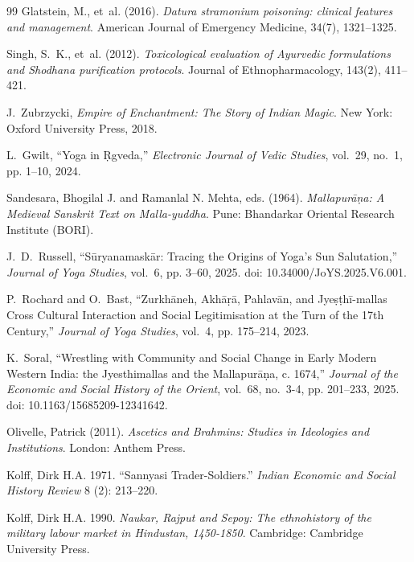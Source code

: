 \documentclass[11pt,twoside,letterpaper]{article}
\begin{document}
\begin{thebibliography}{99}
Glatstein, M., et~al. (2016).
\newblock \textit{Datura stramonium poisoning: clinical features and management}.
\newblock American Journal of Emergency Medicine, 34(7), 1321--1325.

Singh, S.~K., et~al. (2012).
\newblock \textit{Toxicological evaluation of Ayurvedic formulations and Shodhana purification protocols}.
\newblock Journal of Ethnopharmacology, 143(2), 411--421.

J.~Zubrzycki, \textit{Empire of Enchantment: The Story of Indian Magic}. New York: Oxford University Press, 2018.

L.~Gwilt, ``Yoga in Ṛgveda,'' \textit{Electronic Journal of Vedic Studies}, vol.~29, no.~1, pp. 1--10, 2024.

Sandesara, Bhogilal J. and Ramanlal N. Mehta, eds. (1964). \textit{Mallapurāṇa: A Medieval Sanskrit Text on Malla-yuddha}. Pune: Bhandarkar Oriental Research Institute (BORI).

J.~D.~Russell, ``Sūryanamaskār: Tracing the Origins of Yoga’s Sun Salutation,'' \textit{Journal of Yoga Studies}, vol.~6, pp. 3--60, 2025. doi: 10.34000/JoYS.2025.V6.001.

P.~Rochard and O.~Bast, ``Zurkhāneh, Akhāṛā, Pahlavān, and Jyeṣṭhī-mallas Cross Cultural Interaction and Social Legitimisation at the Turn of the 17th Century,'' \textit{Journal of Yoga Studies}, vol.~4, pp. 175--214, 2023.

K.~Soral, ``Wrestling with Community and Social Change in Early Modern Western India: the Jyesthimallas and the Mallapurāṇa, c. 1674,'' \textit{Journal of the Economic and Social History of the Orient}, vol.~68, no.~3-4, pp. 201--233, 2025. doi: 10.1163/15685209-12341642.

Olivelle, Patrick (2011). \textit{Ascetics and Brahmins: Studies in Ideologies and Institutions}. London: Anthem Press.

Kolff, Dirk H.A. 1971. ``Sannyasi Trader-Soldiers.'' \textit{Indian Economic and Social History Review} 8 (2): 213–220.

Kolff, Dirk H.A. 1990. \textit{Naukar, Rajput and Sepoy: The ethnohistory of the military labour market in Hindustan, 1450-1850}. Cambridge: Cambridge University Press.


\end{thebibliography}
\end{document}
